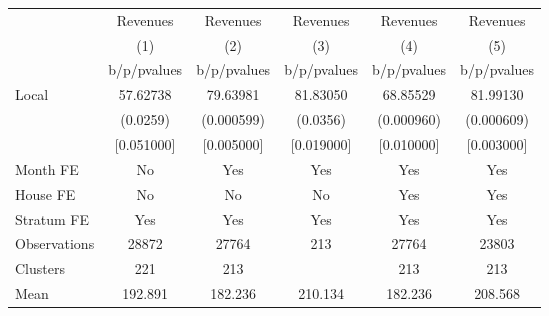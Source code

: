 {
\def\sym#1{\ifmmode^{#1}\else\(^{#1}\)\fi}
\begin{tabular}{l*{5}{c}}
\toprule
                &\multicolumn{1}{c}{Revenues}&\multicolumn{1}{c}{Revenues}&\multicolumn{1}{c}{Revenues}&\multicolumn{1}{c}{Revenues}&\multicolumn{1}{c}{Revenues}\\
                &\multicolumn{1}{c}{(1)}&\multicolumn{1}{c}{(2)}&\multicolumn{1}{c}{(3)}&\multicolumn{1}{c}{(4)}&\multicolumn{1}{c}{(5)}\\
                &b/p/pvalues&b/p/pvalues&b/p/pvalues&b/p/pvalues&b/p/pvalues\\
\midrule
Local           & 57.62738& 79.63981& 81.83050& 68.85529& 81.99130\\
                & (0.0259)&(0.000599)& (0.0356)&(0.000960)&(0.000609)\\
                &[0.051000]&[0.005000]&[0.019000]&[0.010000]&[0.003000]\\
Month FE        &       No&      Yes&      Yes&      Yes&      Yes\\
House FE        &       No&       No&       No&      Yes&      Yes\\
Stratum FE      &      Yes&      Yes&      Yes&      Yes&      Yes\\
\midrule
Observations    &    28872&    27764&      213&    27764&    23803\\
Clusters        &      221&      213&         &      213&      213\\
Mean            &  192.891&  182.236&  210.134&  182.236&  208.568\\
\bottomrule
\end{tabular}
}
